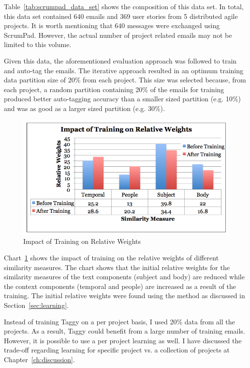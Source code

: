 Table~\ref{tab:scrumpad_data_set} shows the composition of this data set. In total, this data set contained 640 emails and 369 user stories from 5 distributed agile projects. It is worth mentioning that 640 messages were exchanged using ScrumPad. However, the actual number of project related emails may not be limited to this volume.

Given this data, the aforementioned evaluation approach was followed to train and auto-tag the emails. The iterative approach resulted in an optimum  training data partition size of 20\% from each project. This size was selected because, from each project, a random partition containing 20\% of the emails for training produced better auto-tagging accuracy than a smaller sized partition (e.g. 10\%) and was as good as a larger sized partition (e.g. 30\%). 

\begin{figure}[htb]
	\centering
	\includegraphics[width=\textwidth]{training.png}
    \caption{Impact of Training on Relative Weights}
	\label{fig:training}
\end{figure}

Chart~\ref{fig:training} shows the impact of training on the relative weights of different similarity measures. The chart shows that the initial relative weights for the similarity measures of the text components (subject and body) are reduced while the context components (temporal and people) are increased as a result of the training. The initial relative weights were found using the method as discussed in Section~\ref{sec:learning}.

Instead of training Taggy on a per project basis, I used 20\% data from all the projects. As a result, Taggy could benefit from a large number of training emails. However, it is possible to use a per project learning as well. I have discussed the trade-off regarding learning for specific project vs. a collection of projects at Chapter~\ref{ch:discussion}.

